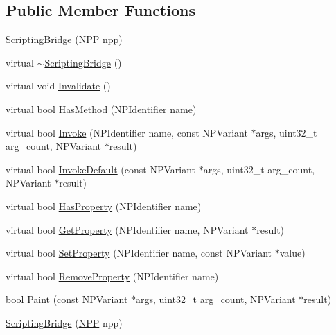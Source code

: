 \subsection*{Public Member Functions}
\begin{DoxyCompactItemize}
\item 
\hyperlink{classpi__generator_1_1_scripting_bridge_abcc778b6a4c482dff1ed271d7e776e42}{ScriptingBridge} (\hyperlink{struct___n_p_p}{NPP} npp)
\item 
virtual \hyperlink{classpi__generator_1_1_scripting_bridge_a605567080f40ddb9a6c2fa4ea9f2e876}{$\sim$ScriptingBridge} ()
\item 
virtual void \hyperlink{classpi__generator_1_1_scripting_bridge_a581ae88aa4acbefc30ae563452ab2fd5}{Invalidate} ()
\item 
virtual bool \hyperlink{classpi__generator_1_1_scripting_bridge_aaa99f91c8ced5df6fac0700516cdd058}{HasMethod} (NPIdentifier name)
\item 
virtual bool \hyperlink{classpi__generator_1_1_scripting_bridge_a3518781037308ae1d63bcdf5cc77a3de}{Invoke} (NPIdentifier name, const NPVariant $\ast$args, uint32\_\-t arg\_\-count, NPVariant $\ast$result)
\item 
virtual bool \hyperlink{classpi__generator_1_1_scripting_bridge_a0589fe559ec8b9297e37239233e238be}{InvokeDefault} (const NPVariant $\ast$args, uint32\_\-t arg\_\-count, NPVariant $\ast$result)
\item 
virtual bool \hyperlink{classpi__generator_1_1_scripting_bridge_a55f52d9e5e377367881e919db10b019f}{HasProperty} (NPIdentifier name)
\item 
virtual bool \hyperlink{classpi__generator_1_1_scripting_bridge_ab97693ce171c216783e79debb3b192cc}{GetProperty} (NPIdentifier name, NPVariant $\ast$result)
\item 
virtual bool \hyperlink{classpi__generator_1_1_scripting_bridge_aa87ffdeb58a36a1e352814132d4a020a}{SetProperty} (NPIdentifier name, const NPVariant $\ast$value)
\item 
virtual bool \hyperlink{classpi__generator_1_1_scripting_bridge_ab1a46993e1a36b9857d48776f7085aa2}{RemoveProperty} (NPIdentifier name)
\item 
bool \hyperlink{classpi__generator_1_1_scripting_bridge_afcd2c9c3e990cae2d713e8bb5d84048d}{Paint} (const NPVariant $\ast$args, uint32\_\-t arg\_\-count, NPVariant $\ast$result)
\item 
\hyperlink{classpi__generator_1_1_scripting_bridge_abcc778b6a4c482dff1ed271d7e776e42}{ScriptingBridge} (\hyperlink{struct___n_p_p}{NPP} npp)

\end{DoxyCompactItemize}
